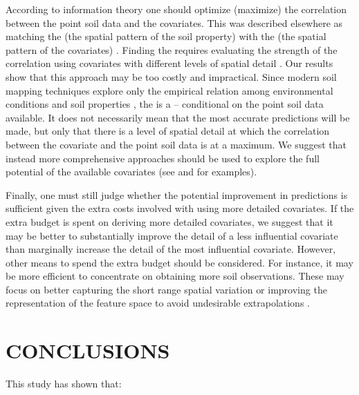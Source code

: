 According to information theory one should optimize (maximize) the correlation between the point soil data and 
the covariates. This was described elsewhere as matching the  (the spatial pattern of the 
soil property) with the  (the spatial pattern of the covariates) \cite{DunganEtAl2002, 
MillerEtAl2014}. Finding the  requires evaluating the strength of the correlation using covariates 
with different levels of spatial detail \cite{DragutEtAl2009, CavazziEtAl2013, MillerEtAl2015}. Our results 
show that this approach may be too costly and impractical. Since modern soil mapping techniques explore only 
the empirical relation among environmental conditions and soil properties \cite{Grunwald2009}, the 
is a  -- conditional on the point soil data available. It does not necessarily mean 
that the most accurate predictions will be made, but only that there is a level of spatial detail at which the 
correlation between the covariate and the point soil data is at a maximum. We suggest that instead more 
comprehensive approaches should be used to explore the full potential of the available covariates (see 
\citet{BehrensEtAl2010a} and \citet{MillerEtAl2015} for examples).

Finally, one must still judge whether the potential improvement in predictions is sufficient given the extra 
costs involved with using more detailed covariates. If the extra budget is spent on deriving more detailed 
covariates, we suggest that it may be better to substantially improve the detail of a less influential
covariate than marginally increase the detail of the most influential covariate. However, other means to spend 
the extra budget should be considered. For instance, it may be more efficient to concentrate on obtaining more 
soil observations. These may focus on better capturing the short range spatial variation \cite{BrusEtAl2007a} 
or improving the representation of the feature space to avoid undesirable extrapolations 
\cite{MinasnyEtAl2006b}.

\section{CONCLUSIONS}

This study has shown that:

